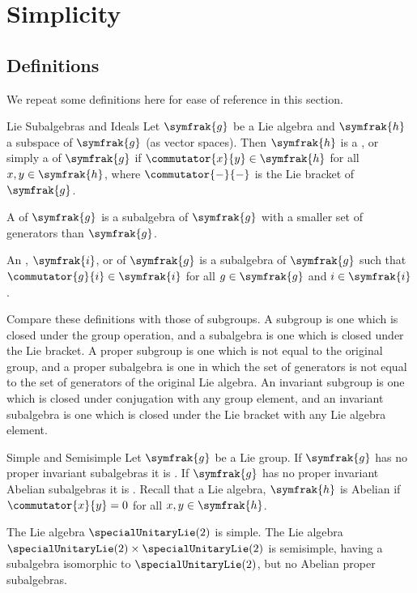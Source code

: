 \documentclass[fleqn]{NotesClass}
\renewcommand{\lie}[1]{\symfrak{#1}}
\begin{document}
    \chapter{Simplicity}
    \section{Definitions}
    We repeat some definitions here for ease of reference in this section.
    \begin{dfn}{Lie Subalgebras and Ideals}{}
        Let \(\lie{g}\) be a Lie algebra and \(\lie{h}\) a subspace of \(\lie{g}\) (as vector spaces).
        Then \(\lie{h}\) is a , or simply a  of \(\lie{g}\) if \(\commutator{x}{y} \in \lie{h}\) for all \(x, y \in \lie{h}\), where \(\commutator{-}{-}\) is the Lie bracket of \(\lie{g}\).
        
        A  of \(\lie{g}\) is a subalgebra of \(\lie{g}\) with a smaller set of generators than \(\lie{g}\).
        
        An , \(\lie{i}\), or  of \(\lie{g}\) is a subalgebra of \(\lie{g}\) such that \(\commutator{g}{i} \in \lie{i}\) for all \(g \in \lie{g}\) and \(i \in \lie{i}\).
    \end{dfn}
    Compare these definitions with those of subgroups.
    A subgroup is one which is closed under the group operation, and a subalgebra is one which is closed under the Lie bracket.
    A proper subgroup is one which is not equal to the original group, and a proper subalgebra is one in which the set of generators is not equal to the set of generators of the original Lie algebra.
    An invariant subgroup is one which is closed under conjugation with any group element, and an invariant subalgebra is one which is closed under the Lie bracket with any Lie algebra element.
    
    \begin{dfn}{Simple and Semisimple}{}
        Let \(\lie{g}\) be a Lie group.
        If \(\lie{g}\) has no proper invariant subalgebras it is .
        If \(\lie{g}\) has no proper invariant Abelian subalgebras it is .
        Recall that a Lie algebra, \(\lie{h}\) is Abelian if \(\commutator{x}{y} = 0\) for all \(x, y \in \lie{h}\).
    \end{dfn}
    
    \begin{exm}{}{}
        The Lie algebra \(\specialUnitaryLie(2)\) is simple.
        The Lie algebra \(\specialUnitaryLie(2) \times \specialUnitaryLie(2)\) is semisimple, having a subalgebra isomorphic to \(\specialUnitaryLie(2)\), but no Abelian proper subalgebras.
    \end{exm}
    
\end{document}
